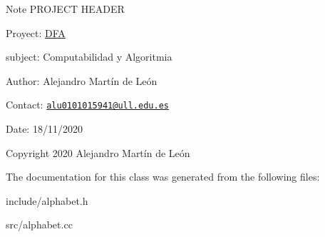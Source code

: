 \begin{DoxyNote}{Note}
P\+R\+O\+J\+E\+CT H\+E\+A\+D\+ER 

Proyect\+: \hyperlink{classDFA}{D\+FA} 

subject\+: Computabilidad y Algoritmia 

Author\+: Alejandro Martín de León 

Contact\+: \href{mailto:alu0101015941@ull.edu.es}{\tt alu0101015941@ull.\+edu.\+es} 

Date\+: 18/11/2020 

Copyright 2020 Alejandro Martín de León 
\end{DoxyNote}


The documentation for this class was generated from the following files\+:\begin{DoxyCompactItemize}
\item 
include/alphabet.\+h\item 
src/alphabet.\+cc\end{DoxyCompactItemize}
